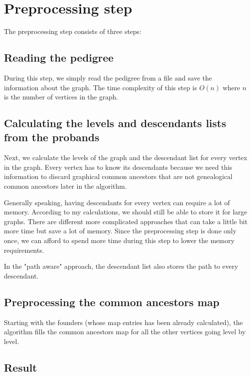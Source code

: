 \documentclass[14pt]{extarticle}
\begin{document}
		
\section{Preprocessing step}

The preprocessing step consists of three steps:

\subsection{Reading the pedigree}

During this step, we simply read the pedigree from a file and save the information about the graph. The time complexity of this step is $O(n)$ where $n$ is the number of vertices in the graph.

\subsection{Calculating the levels and descendants lists from the probands}

Next, we calculate the levels of the graph and the descendant list for every vertex in the graph. Every vertex has to know its descendants because we need this information to discard graphical common ancestors that are not genealogical common ancestors later in the algorithm.

Generally speaking, having descendants for every vertex can require a lot of memory. According to my calculations, we should still be able to store it for large graphs. There are different more complicated approaches that can take a little bit more time but save a lot of memory. Since the preprocessing step is done only once, we can afford to spend more time during this step to lower the memory requirements.

In the "path aware" approach, the descendant list also stores the path to every descendant.

\subsection{Preprocessing the common ancestors map}

Starting with the founders (whose map entries has been already calculated), the algorithm fills the common ancestors map for all the other vertices going level by level.

\subsection{Result}
\end{document}
